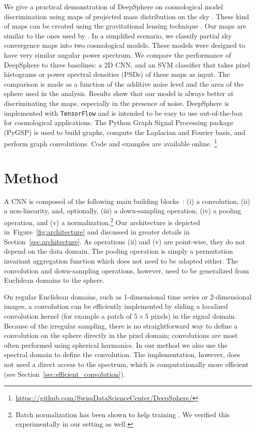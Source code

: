 \documentclass[final,twocolumn,3p,times,sort&compress]{elsarticle}
\newcommand{\figref}[1]{Figure~\ref{fig:#1}}
\newcommand{\secref}[1]{Section~\ref{sec:#1}}
\newcommand{\1}{\b{1}}              %
\newcommand{\0}{\b{0}}              %
\newcommand{\pkg}[1]{\texttt{#1}}
\begin{document}
We give a practical demonstration of DeepSphere on cosmological model discrimination using maps of projected mass distribution on the sky \citep{chang2017curvedsky}.
These kind of maps can be created using the gravitational lensing technique \citep[see][for review]{BartelmannSchneider2001weak}.
Our maps are similar to the ones used by \citep{schmelze2017cosmologicalmodel}.
In a simplified scenario, we classify partial sky convergence maps into two cosmological models.
These models were designed to have very similar angular power spectrum.
We compare the performance of DeepSphere to three baselines: a 2D CNN, and an SVM classifier that takes pixel histograms or power spectral densities (PSDs) of these maps as input.
The comparison is made as a function of the additive noise level and the area of the sphere used in the analysis.
Results show that our model is always better at discriminating the maps, especially in the presence of noise.
DeepSphere is implemented with \pkg{TensorFlow} \citep{abadi2016tensorflow} and is intended to be easy to use out-of-the-box for cosmological applications.
The Python Graph Signal Processing package (PyGSP) \citep{pygsp} is used to build graphs, compute the Laplacian and Fourier basis, and perform graph convolutions.
Code and examples are available online.{ \footnote{\url{https://github.com/SwissDataScienceCenter/DeepSphere/}}}


\section{Method}
\label{sec:method}

A CNN is composed of the following main building blocks~\citep{lecun1998cnn}:
(i) a convolution,
(ii) a non-linearity, and, optionally,
(iii) a down-sampling operation,
(iv) a pooling operation, and
(v) a normalization.\footnote{Batch normalization has been shown to help training \citep{ioffe2015batchnorm}. We verified this experimentally in our setting as well.}
Our architecture is depicted in~\figref{architecture} and discussed in greater details in \secref{architecture}. As operations (ii) and (v) are point-wise, they do not depend on the data domain. The pooling operation is simply a permutation invariant aggregation function which does not need to be adapted either. The convolution and down-sampling operations, however, need to be generalized from Euclidean domains to the sphere.

On regular Euclidean domains, such as 1-dimensional time series or 2-dimensional images, a convolution can be efficiently implemented by sliding a localized convolution kernel (for example a patch of $5 \times 5$ pixels) in the signal domain.
Because of the irregular sampling, there is no straightforward way to define a convolution on the sphere directly in the pixel domain; convolutions are most often performed using spherical harmonics.
In our method we also use the spectral domain to define the convolution.
The implementation, however, does not need a direct access to the spectrum, which is computationally more efficient (see \secref{efficient_convolution}).
\end{document}

